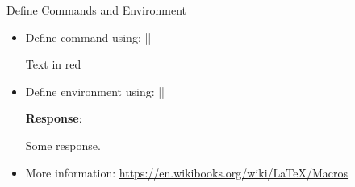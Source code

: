 \begin{frame}[fragile]{Define Commands and Environment}
  \begin{itemize}
    \item Define command using: \latexinline|\newcommand{\name}[num]{definition}|
          \begin{latexexample}
            \newcommand{\highlight}[1]{%
              {\color{red} #1}%
            }
            \highlight{Text in red}
          \end{latexexample}
    \item Define environment using: \latexinline|\newenvironment{name}[num]{before}{after}|
          \begin{latexexample}
            \newenvironment{response}{%
              \begingroup
              \textbf{Response}: \itshape
            }{%
              \endgroup
            }
            \begin{response}
              Some response.
            \end{response}
          \end{latexexample}
      \item More information: \url{https://en.wikibooks.org/wiki/LaTeX/Macros}
  \end{itemize}
\end{frame}

